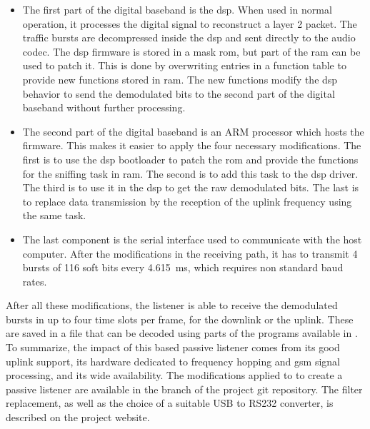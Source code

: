 \begin{itemize}[topsep=-1em,parsep=0em,itemsep=0.5em]
      \item The first part of the digital baseband is the \gls{dsp}.
        When used in normal operation, it processes the digital signal
        to reconstruct a layer 2 packet. The traffic bursts are
        decompressed inside the \gls{dsp} and sent directly to the audio
        codec. The \gls{dsp} firmware is stored in a mask \gls{rom}, but
        part of the \gls{ram} can be used to patch it. This is done by
        overwriting entries in a function table to provide new functions
        stored in \gls{ram}. The new functions modify the \gls{dsp}
        behavior to send the demodulated bits to the second part of the
        digital baseband without further processing.

      \item The second part of the digital baseband is an ARM processor
        which hosts the  firmware. This makes it easier
        to apply the four necessary modifications. The first is to use
        the \gls{dsp} bootloader to patch the \gls{rom} and provide the
        functions for the sniffing task in \gls{ram}. The second is to
        add this task to the \gls{dsp} driver. The third is to use it in
        the \gls{dsp} to get the raw demodulated bits. The last is to
        replace data transmission by the reception of the uplink
        frequency using the same task.

      \item The last component is the serial interface used to
        communicate with the host computer. After the modifications in
        the receiving path, it has to transmit 4 bursts of 116 soft bits
        every \SI{4.615}{\milli\second}, which requires non standard
        baud rates.

    \end{itemize}

    After all these modifications, the listener is able to receive the
    demodulated bursts in up to four time slots per frame, for the
    downlink or the uplink. These are saved in a file that can be
    decoded using parts of the programs available in . To
    summarize, the impact of this  based passive
    listener comes from its good uplink support, its hardware dedicated
    to frequency hopping and \gls{gsm} signal processing, and its wide
    availability. The modifications applied to  to
    create a passive listener are available in the
     branch of the project git repository. The
    filter replacement, as well as the choice of a suitable USB to RS232
    converter, is described on the project website.

